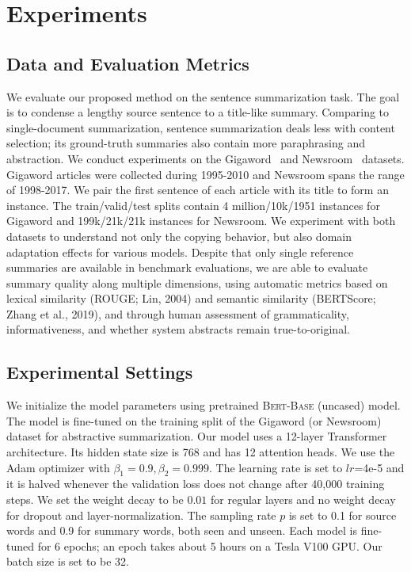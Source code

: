 \documentclass[letterpaper]{article} %
\begin{document}
\section{Experiments}
\label{sec:experiments}


\subsection{Data and Evaluation Metrics}
\label{sec:data}

We evaluate our proposed method on the sentence summarization task.
The goal is to condense a lengthy source sentence to a title-like summary.
Comparing to single-document summarization, sentence summarization deals less with content selection; 
its ground-truth summaries also contain more paraphrasing and abstraction. 
We conduct experiments on the Gigaword~\cite{Parker:2011} and Newsroom~\cite{Grusky:2018} datasets.
Gigaword articles were collected during 1995-2010 and Newsroom spans the range of 1998-2017.
We pair the first sentence of each article with its title to form an instance.
The train/valid/test splits contain 4 million/10k/1951 instances for Gigaword and 199k/21k/21k instances for Newsroom.
We experiment with both datasets to understand not only the copying behavior, but also domain adaptation effects for various models.
Despite that only single reference summaries are available in benchmark evaluations, we are able to evaluate summary quality along multiple dimensions, using automatic metrics based on lexical similarity (ROUGE; Lin, 2004)\nocite{Lin:2004} and semantic similarity (BERTScore; Zhang et al., 2019)\nocite{Zhang:2019:BERTScore}, and through human assessment of grammaticality, informativeness, and whether system abstracts remain true-to-original.

\subsection{Experimental Settings}
\label{sec:settings}

We initialize the model parameters using pretrained \textsc{Bert-Base} (uncased) model.
The model is fine-tuned on the training split of the Gigaword (or Newsroom) dataset for abstractive summarization.
Our model uses a 12-layer Transformer architecture. 
Its hidden state size is 768 and has 12 attention heads.
We use the Adam optimizer with $\beta_1=0.9, \beta_2=0.999$.
The learning rate is set to $lr$=4e-5 and it is halved whenever the validation loss does not change after 40,000 training steps.
We set the weight decay to be $0.01$ for regular layers and no weight decay for dropout and layer-normalization.
The sampling rate $p$ is set to 0.1 for source words and 0.9 for summary words, both seen and unseen. 
Each model is fine-tuned for 6 epochs; an epoch takes about 5 hours on a Tesla V100 GPU.
Our batch size is set to be 32.
\end{document}
